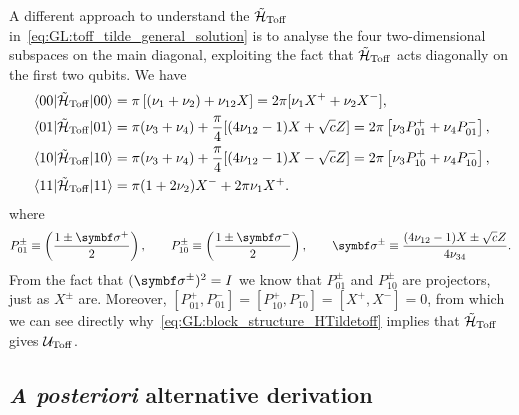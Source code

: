 A different approach to understand the $\tilde{{\mathcal{H}}}_{\operatorname{Toff}}$ in~\cref{eq:GL:toff_tilde_general_solution} is to analyse the four two-dimensional subspaces on the main diagonal, exploiting the fact that $\tilde{{\mathcal{H}}}_{\operatorname{Toff}}$ acts diagonally on the first two qubits.
We have
\begin{equation}
\begin{aligned}
	\mel{00}{\tilde{{\mathcal{H}}}_{\operatorname{Toff}}}{00} &=
    \pi \left[(\nu_1+\nu_2)+\nu_{12} X\right] =
    2\pi[\nu_1 X^+ + \nu_2 X^-], \\
	\mel{01}{\tilde{{\mathcal{H}}}_{\operatorname{Toff}}}{01} &=
    \pi(\nu_3+\nu_4) + \frac{\pi}{4}[(4\nu_{12}-1) X + \sqrt{c} Z] =
    2\pi\left[\nu_3 P_{01}^+ + \nu_4 P_{01}^-\right], \\
	\mel{10}{\tilde{{\mathcal{H}}}_{\operatorname{Toff}}}{10} &=
    \pi(\nu_3+\nu_4) + \frac{\pi}{4}[(4\nu_{12}-1) X - \sqrt{c} Z] =
    2\pi\left[\nu_3 P_{10}^+ + \nu_4 P_{10}^-\right], \\
	\mel{11}{\tilde{{\mathcal{H}}}_{\operatorname{Toff}}}{11} &=
    \pi(1 + 2\nu_2) X^- + 2\pi \nu_1 X^+.
\end{aligned}
\label{eq:GL:block_structure_HTildetoff}
\end{equation}
where
\begin{equation}
    P_{01}^\pm \equiv \left(\frac{1\pm\bs\sigma^+}{2}\right), \qquad
    P_{10}^\pm \equiv \left(\frac{1\pm\bs\sigma^-}{2}\right), \qquad
    \bs\sigma^\pm \equiv \frac{(4\nu_{12}-1)X\pm\sqrt c Z}{4\nu_{34}}.
\end{equation}
From the fact that $(\bs\sigma^\pm)^2=I$ we know that $P_{01}^\pm$ and $P_{10}^\pm$ are projectors, just as $X^\pm$ are. Moreover, $[P_{01}^+,P_{01}^-]=[P_{10}^+,P_{10}^-]=[X^+,X^-]=0$, from which we can see directly why~\cref{eq:GL:block_structure_HTildetoff} implies that $\tilde{{\mathcal{H}}}_{\operatorname{Toff}}$ gives ${\mathcal{U}}_{\operatorname{Toff}}$.


\subsection{\textit{A posteriori} alternative derivation}
\label{subsec:GL:toffoli_posteriori_derivation}

